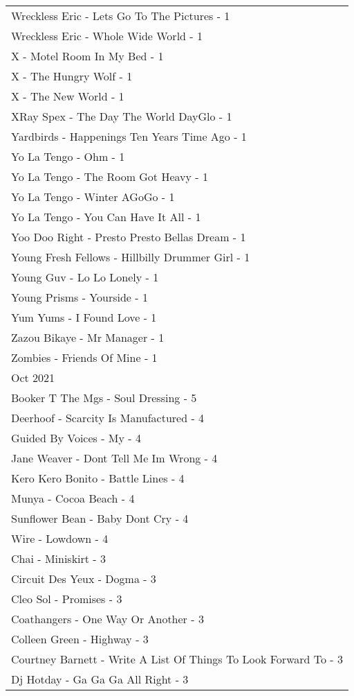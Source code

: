 \documentclass[
]{article}
\begin{document}
\begin{longtable}{l}
Wreckless Eric - Lets Go To The Pictures - 1 \\ 
Wreckless Eric - Whole Wide World - 1 \\ 
X - Motel Room In My Bed - 1 \\ 
X - The Hungry Wolf - 1 \\ 
X - The New World - 1 \\ 
XRay Spex - The Day The World DayGlo - 1 \\ 
Yardbirds - Happenings Ten Years Time Ago - 1 \\ 
Yo La Tengo - Ohm - 1 \\ 
Yo La Tengo - The Room Got Heavy - 1 \\ 
Yo La Tengo - Winter AGoGo - 1 \\ 
Yo La Tengo - You Can Have It All - 1 \\ 
Yoo Doo Right - Presto Presto Bellas Dream - 1 \\ 
Young Fresh Fellows - Hillbilly Drummer Girl - 1 \\ 
Young Guv - Lo Lo Lonely - 1 \\ 
Young Prisms - Yourside - 1 \\ 
Yum Yums - I Found Love - 1 \\ 
Zazou Bikaye - Mr Manager - 1 \\ 
Zombies - Friends Of Mine - 1 \\ 
\midrule
\multicolumn{1}{l}{Oct 2021} \\ 
\midrule
Booker T The Mgs - Soul Dressing - 5 \\ 
Deerhoof - Scarcity Is Manufactured - 4 \\ 
Guided By Voices - My - 4 \\ 
Jane Weaver - Dont Tell Me Im Wrong - 4 \\ 
Kero Kero Bonito - Battle Lines - 4 \\ 
Munya - Cocoa Beach - 4 \\ 
Sunflower Bean - Baby Dont Cry - 4 \\ 
Wire - Lowdown - 4 \\ 
Chai - Miniskirt - 3 \\ 
Circuit Des Yeux - Dogma - 3 \\ 
Cleo Sol - Promises - 3 \\ 
Coathangers - One Way Or Another - 3 \\ 
Colleen Green - Highway - 3 \\ 
Courtney Barnett - Write A List Of Things To Look Forward To - 3 \\ 
Dj Hotday - Ga Ga Ga All Right - 3 \\ 

\end{longtable}
\end{document}
